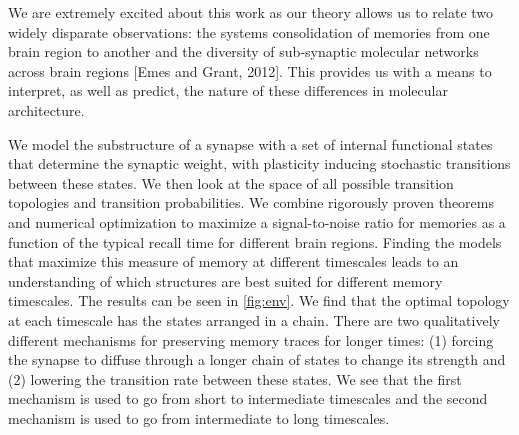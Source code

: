 \documentclass[12pt]{article}
\begin{document}
We are extremely excited about this work as our theory allows us to relate two widely disparate observations: the systems consolidation of memories from one brain region to another and the diversity of sub-synaptic molecular networks across brain regions [Emes and Grant, 2012]. This provides us with a means to interpret, as well as predict, the nature of these differences in molecular architecture.

We model the substructure of a synapse with a set of internal functional states that determine the synaptic weight, with plasticity inducing stochastic transitions between these states. We then look at the space of all possible transition topologies and transition probabilities. We combine rigorously proven theorems and numerical optimization to maximize a signal-to-noise ratio for memories as a function of the typical recall time for different brain regions. Finding the models that maximize this measure of memory at different timescales leads to an understanding of which structures are best suited for different memory timescales. The results can be seen in \autoref{fig:env}. We find that the optimal topology at each timescale has the states arranged in a chain. There are two qualitatively different mechanisms for preserving memory traces for longer times: (1) forcing the synapse to diffuse through a longer chain of states to change its strength and (2) lowering the transition rate between these states. We see that the first mechanism is used to go from short to intermediate timescales and the second mechanism is used to go from intermediate to long timescales.
\end{document}

